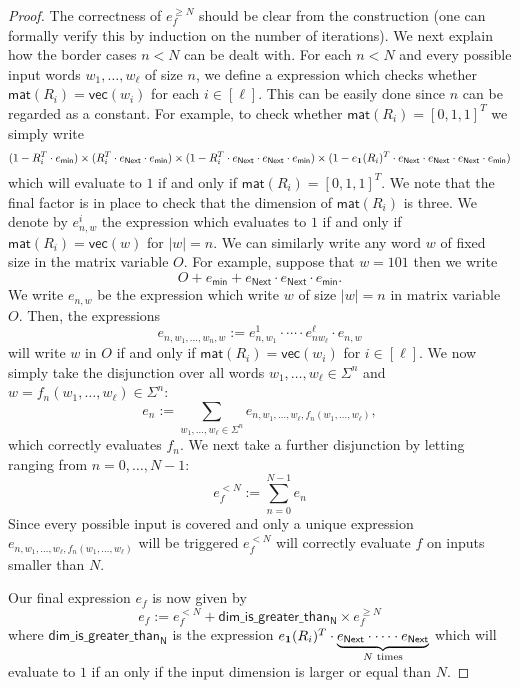 \begin{proof}
    The correctness of $e_f^{\geq N}$ should be clear from the construction (one can formally verify this by
    induction on the number of iterations). We next explain how the border cases $n<N$ can be dealt with.
    For each $n<N$ and every possible input words
    $w_1,\ldots,w_\ell$ of size $n$, we define a \langfor expression which checks whether
    $\mathsf{mat}(R_i)=\mathsf{vec}(w_i)$ for each $i\in[\ell]$. This can be easily done since $n$ 
    can be regarded as a constant. For example, to check whether $\mathsf{mat}(R_i)=[0,1,1]^T$ we simply write
    $$
    (1- R_i^T\cdot e_{\mathsf{min}})\times (R_i^T\cdot e_{\mathsf{Next}}\cdot e_{\mathsf{min}})\times (1- R_i^T\cdot e_{\mathsf{Next}}\cdot e_{\mathsf{Next}}\cdot e_{\mathsf{min}})\times (1- e_{\mathbf{1}}(R_i)^T\cdot e_{\mathsf{Next}}\cdot e_{\mathsf{Next}}\cdot e_{\mathsf{Next}}\cdot e_{\mathsf{min}})
    $$
    which will evaluate to $1$ if and only if $\mathsf{mat}(R_i)=[0,1,1]^T$. We note that the final factor is in 
    place to check that the dimension of $\mathsf{mat}(R_i)$ is three.
    We denote by
    $e_{n,w}^i$ the expression which evaluates to $1$ if and only if $\mathsf{mat}(R_i)=\mathsf{vec}(w)$
    for $|w|=n$.
    We can similarly
    write any word $w$ of fixed size in the matrix variable $O$. For example, suppose that $w=101$
    then we write 
    $$
    O+ e_{\mathsf{min}}+  e_{\mathsf{Next}}\cdot e_{\mathsf{Next}}\cdot e_{\mathsf{min}}.
    $$
    We write $e_{n,w}$ be the expression which write $w$ of size $|w|=n$ in matrix variable $O$.
    Then, the expressions
    $$
    e_{n,w_1,\ldots,w_n,w}:=e_{n,w_1}^1\cdot\cdots\cdot e_{nw_{\ell}}^\ell\cdot e_{n,w}
    $$
    will write $w$ in $O$ if and only if $\mathsf{mat}(R_i)=\mathsf{vec}(w_i)$ for $i\in[\ell]$.
    We now simply take the disjunction over all words 
    $w_1,\ldots,w_\ell\in\Sigma^n$ and $w=f_n(w_1,\ldots,w_\ell)\in\Sigma^n$:
    $$
    e_n:=\sum_{w_1,\ldots,w_\ell\in\Sigma^n} e_{n,w_1,\ldots,w_\ell,f_n(w_1,\ldots,w_\ell)},
    $$
    which correctly evaluates $f_n$. We next take a further disjunction by letting ranging from 
    $n=0,\ldots, N-1$:
    $$
    e_f^{<N}:=\sum_{n=0}^{N-1} e_n
    $$
    Since every possible input is covered and only a unique expression 
    $ e_{n,w_1,\ldots,w_\ell,f_n(w_1,\ldots,w_\ell)}$ will be triggered $e_f^{<N}$ will correctly
    evaluate $f$ on inputs smaller than $N$.

    Our final expression $e_f$ is now given by
    $$
    e_f:=e_f^{<N} + \mathsf{dim\_is\_greater\_than_N}\times e_f^{\geq N}
    $$
    where $\mathsf{dim\_is\_greater\_than_N}$ is the expression
    $e_{\mathbf{1}}(R_i)^T\cdot\underbrace{e_{\mathsf{Next}}\cdot\cdots\cdot e_{\mathsf{Next}}}_{\text{$N$ times}}$ 
    which will evaluate to $1$ if an only if the input dimension is larger or equal than $N$.
\end{proof}
